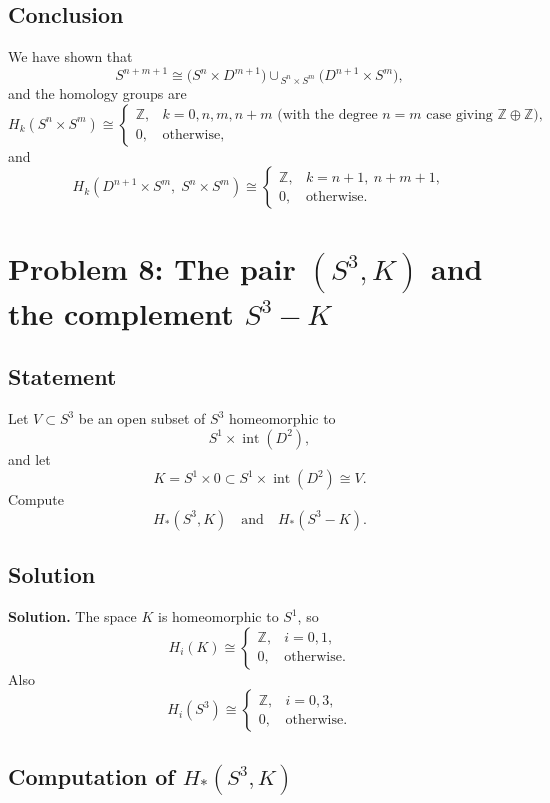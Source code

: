\documentclass[12pt,a4paper]{article}
\theoremstyle{notespace}
\begin{document}
\subsection{Conclusion}

We have shown that
\[
S^{n+m+1}
\cong
\bigl(S^n \times D^{m+1}\bigr)\cup_{\,S^n \times S^m}\bigl(D^{n+1} \times S^m\bigr),
\]
and the homology groups are
\[
H_k(S^n \times S^m)\cong
\begin{cases}
	\mathbb Z, & k=0,n,m,n+m
	\text{ (with the degree \(n=m\) case giving } \mathbb Z\oplus\mathbb Z\text{)},\\
	0, & \text{otherwise},
\end{cases}
\]
and
\[
H_k(D^{n+1} \times S^m,\; S^n \times S^m)
\cong
\begin{cases}
	\mathbb Z, & k=n+1,\ n+m+1,\\
	0, & \text{otherwise}.
\end{cases}
\]

\section{Problem 8: The pair \((S^3,K)\) and the complement \(S^3 - K\)}

\subsection{Statement}

Let \(V \subset S^3\) be an open subset of \(S^3\) homeomorphic to
\[
S^1 \times \operatorname{int}(D^2),
\]
and let
\[
K=S^1 \times 0 \subset S^1 \times \operatorname{int}(D^2)\cong V.
\]
Compute
\[
H_*(S^3,K)
\quad\text{and}\quad
H_*(S^3-K).
\]

\subsection{Solution}

\textbf{Solution.}
The space \(K\) is homeomorphic to \(S^1\), so
\[
H_i(K)\cong
\begin{cases}
	\mathbb Z, & i=0,1,\\
	0, & \text{otherwise}.
\end{cases}
\]
Also
\[
H_i(S^3)\cong
\begin{cases}
	\mathbb Z, & i=0,3,\\
	0, & \text{otherwise}.
\end{cases}
\]

\subsection{Computation of \(H_*(S^3,K)\)}
\end{document}
